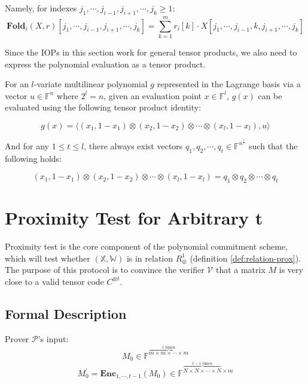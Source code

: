 Namely, for indexes $j_1, \cdots, j_{i-1}, j_{i+1}, \cdots , j_{k} \ge 1$:
$$
\textbf{Fold}_i(X, r)[j_1, \cdots, j_{i-1}, j_{i+1}, \cdots , j_{k}] = \sum_{k=1}^{m} r_{i}[k] \cdot X[j_1, \cdots, j_{i-1}, k, j_{i+1}, \cdots , j_{k}]
$$



Since the IOPs in this section work for general tensor products, we also need to express the polynomial evaluation as a tensor product.

\begin{lemma}
\label{lemma:petq}

For an $l$-variate multilinear polynomial $g$ represented in the Lagrange basis via a vector $u \in \mathbb{F}^{n}$ where $2^l = n$, given an evaluation point $x \in \mathbb{F}^l$, $g(x)$ can be evaluated using the following tensor product identity: 

\[
    g(x) = \langle (x_1, 1-x_1) \otimes (x_2, 1-x_2) \otimes \cdots \otimes (x_l, 1-x_l) , u \rangle
\]

And for any $ 1 \le t  \le l$, there always exist vectors $q_1, q_2, \cdots , q_t \in \mathbb{F}^{n^{\frac{1}{t}}}$ such that the following holds:

\[
    (x_1, 1-x_1) \otimes (x_2, 1-x_2) \otimes \cdots \otimes (x_l, 1-x_l) = q_1 \otimes q_2 \otimes \cdots \otimes q_t
\]

\end{lemma}


\section{Proximity Test for Arbitrary t}

Proximity test is the core component of the polynomial commitment scheme, which will test whether $(\mathbb{X}, \mathbb{W})$ is in relation $R_\otimes^1$ (definition \ref{def:relation-prox}). The purpose of this protocol is to convince the verifier $\mathcal{V}$ that a matrix $M$ is very close to a valid tensor code $C^{\otimes t}$.

\subsection{Formal Description}

Prover $\mathcal{P}$'s input: 
$$
    M_0 \in \mathbb{F}^{\overbrace{m \times m \times \cdots \times m}^{t \text{ times}}}
$$
$$
    M_0^{\prime} = \textbf{Enc}_{1,\cdots,t-1}(M_0) \in \mathbb{F}^{\overbrace{N \times N \times \cdots \times N}^{t-1 \text{ times}} \times m}
$$

